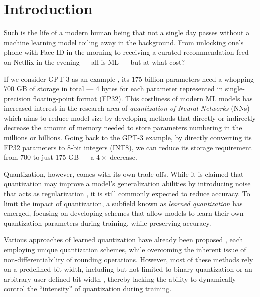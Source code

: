 \chapter{Introduction\label{cha:chapter1}}

\hspace*{1em}Such is the life of a modern human being that not a single day passes 
without a machine learning model toiling away in the background. 
From unlocking one's phone with Face ID in the morning 
to receiving a curated recommendation feed on Netflix in the evening — 
all is ML — but at what cost?

If we consider GPT-3 as an example \cite{DBLP:journals/corr/abs-2005-14165}, 
its 175 billion parameters need a whopping 700 GB of storage in total —  
4 bytes for each parameter represented in single-precision floating-point format (FP32).
This costliness of modern ML models has increased interest in the research area
of \textit{quantization of Neural Networks} (NNs) 
which aims to reduce model size by developing methods 
that directly or indirectly decrease the amount of memory 
needed to store parameters numbering in the millions or billions. 
Going back to the GPT-3 example, 
by directly converting its FP32 parameters
to 8-bit integers (INT8), we can reduce its storage requirement 
from 700 to just 175 GB  — a \( 4 \times\) decrease. 

Quantization, however, comes with its own trade-offs. 
While it is claimed that quantization may improve a model's generalization abilities
by introducing noise that acts as regularization \cite{courbariaux2015binaryconnect},
it is still commonly expected to reduce accuracy. 
To limit the impact of quantization, 
a subfield known as \textit{learned quantization} has emerged, 
focusing on developing schemes that allow models to learn their own quantization parameters
during training, while preserving accuracy.

Various approaches of learned quantization have already been proposed \cite{DBLP:conf/cvpr/JungSLSHKHC19, DBLP:conf/iclr/EsserMBAM20, DBLP:conf/eccv/ZhangYYH18, shuchang2016dorafenet}, 
each employing unique quantization schemes, while overcoming the inherent issue of non-differentiability of rounding operations. 
However, most of these methods rely on a predefined bit width, 
including but not limited to binary quantization \cite{DBLP:conf/nips/HubaraCSEB16, rastegari2016xnor, courbariaux2015binaryconnect} 
or an arbitrary user-defined bit width \cite{shuchang2016dorafenet}, 
thereby lacking the ability to dynamically control the “intensity” of quantization during training.

